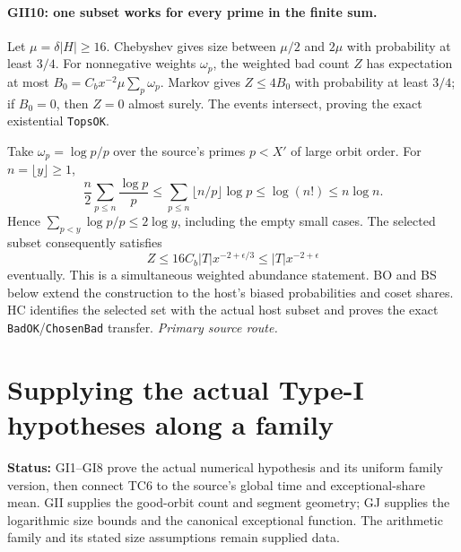 \documentclass[11pt,a4paper]{article}
\numberwithin{equation}{section}
\theoremstyle{remark}\newtheorem{remark}[theorem]{Remark}
\newcommand{\status}[1]{\textbf{Status:} #1}
\begin{document}
\paragraph{GII10: one subset works for every prime in the finite sum.}
Let $\mu=\delta|H|\ge16$. Chebyshev gives size between $\mu/2$ and
$2\mu$ with probability at least $3/4$. For nonnegative weights
$\omega_p$, the weighted bad count $Z$ has expectation at most
$B_0=C_bx^{-2}\mu\sum_p\omega_p$. Markov gives $Z\le4B_0$ with
probability at least $3/4$; if $B_0=0$, then $Z=0$ almost surely.
The events intersect, proving the exact existential \texttt{TopsOK}.

Take $\omega_p=\log p/p$ over the source's primes $p<X'$ of large
orbit order. For $n=\lfloor y\rfloor\ge1$,
\[
 \frac n2\sum_{p\le n}\frac{\log p}{p}
 \le\sum_{p\le n}\lfloor n/p\rfloor\log p
 \le\log(n!)\le n\log n.
\]
Hence $\sum_{p<y}\log p/p\le2\log y$, including the empty small cases.
The selected subset consequently satisfies
\[
 Z\le16C_b|T|x^{-2+\epsilon/3}
   \le |T|x^{-2+\epsilon}\tag{GII.13}
\]
eventually. This is a simultaneous weighted abundance statement.
BO and BS below extend the construction to the host's biased probabilities
and coset shares. HC identifies the selected set with the actual host
subset and proves the exact \texttt{BadOK}/\texttt{ChosenBad} transfer.
\noindent\textit{Primary source route.}\cite{type-two-family}


\section{Supplying the actual Type-I hypotheses along a family}
\label{sec:type-one-family}

\status{GI1--GI8 prove the actual numerical hypothesis and its
uniform family version, then connect TC6 to the source's global
time and exceptional-share mean. GII supplies the good-orbit
count and segment geometry; GJ supplies the logarithmic size
bounds and the canonical exceptional function. The arithmetic
family and its stated size assumptions remain supplied data.}
\end{document}
